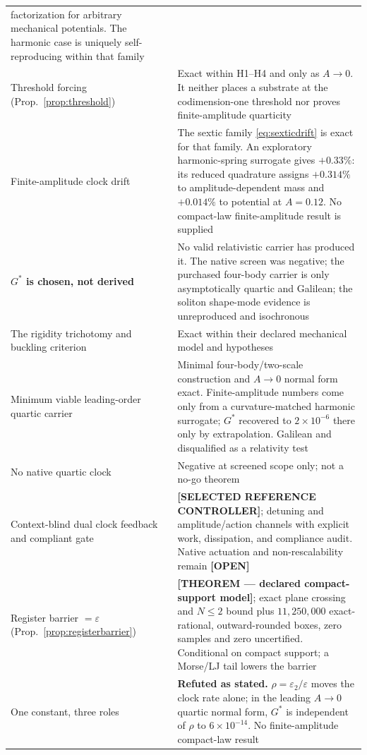 \documentclass[11pt,a4paper]{article}
\newcommand{\Gstar}{{G^{*}}}
\theoremstyle{definition}
\theoremstyle{plain}
\theoremstyle{remark}
\begin{document}
{\begin{longtable}{p{} p{}}
factorization for arbitrary mechanical potentials. The harmonic case is
uniquely self-reproducing within that family \\
Threshold forcing (Prop.~\ref{prop:threshold}) & Exact within H1--H4 and
only as $A\to0$. It neither places a substrate at the codimension-one
threshold nor proves finite-amplitude quarticity \\
Finite-amplitude clock drift & The sextic family
\eqref{eq:sexticdrift} is exact for that family. An exploratory
harmonic-spring surrogate gives $+0.33\%$: its reduced quadrature assigns
$+0.314\%$ to amplitude-dependent mass and $+0.014\%$ to potential at
$A=0.12$. No compact-law finite-amplitude result is supplied \\
\textbf{$\Gstar$ is chosen, not derived} & No valid relativistic carrier
has produced it. The native screen was negative; the purchased four-body
carrier is only asymptotically quartic and Galilean; the soliton
shape-mode evidence is
unreproduced and isochronous \\
The rigidity trichotomy and buckling criterion & Exact within their
declared mechanical model and hypotheses \\
Minimum viable leading-order quartic carrier & Minimal four-body/two-scale
construction and $A\to0$ normal form exact. Finite-amplitude numbers come
only from a curvature-matched harmonic surrogate; $\Gstar$ recovered to
$2\times10^{-6}$ there only by extrapolation. Galilean and disqualified as
a relativity test \\
No native quartic clock & Negative at screened scope only; not a no-go
theorem \\
Context-blind dual clock feedback and compliant gate & \textbf{[SELECTED
REFERENCE CONTROLLER]}; detuning and amplitude/action channels with explicit
work, dissipation, and compliance audit. Native actuation and non-rescalability
remain \textbf{[OPEN]} \\
Register barrier $=\varepsilon$ (Prop.~\ref{prop:registerbarrier}) &
\textbf{[THEOREM --- declared compact-support model]}; exact plane crossing
and $N\le2$ bound plus $11{,}250{,}000$ exact-rational,
outward-rounded boxes, zero samples and zero uncertified. Conditional on
compact support; a Morse/LJ tail lowers the barrier \\
One constant, three roles & \textbf{Refuted as stated.}
$\rho=\varepsilon_2/\varepsilon$ moves the clock rate alone; in the
leading $A\to0$ quartic normal form, $\Gstar$ is independent of $\rho$ to
$6\times10^{-14}$. No finite-amplitude compact-law result \\

\end{longtable}}
\end{document}
